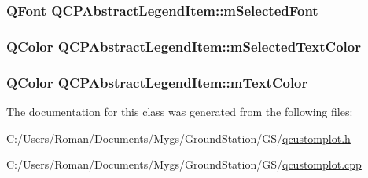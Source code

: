 \subsubsection[{m\+Selected\+Font}]{\setlength{\rightskip}{0pt plus 5cm}Q\+Font Q\+C\+P\+Abstract\+Legend\+Item\+::m\+Selected\+Font\hspace{0.3cm}{\ttfamily [protected]}}\label{class_q_c_p_abstract_legend_item_ab971df604306b192875a7d097feb1e21}
\hypertarget{class_q_c_p_abstract_legend_item_a4965c13854d970b24c284f0a4f005fbd}{}
\subsubsection[{m\+Selected\+Text\+Color}]{\setlength{\rightskip}{0pt plus 5cm}Q\+Color Q\+C\+P\+Abstract\+Legend\+Item\+::m\+Selected\+Text\+Color\hspace{0.3cm}{\ttfamily [protected]}}\label{class_q_c_p_abstract_legend_item_a4965c13854d970b24c284f0a4f005fbd}
\hypertarget{class_q_c_p_abstract_legend_item_a974b21e9930227d281344bd2242d289d}{}
\subsubsection[{m\+Text\+Color}]{\setlength{\rightskip}{0pt plus 5cm}Q\+Color Q\+C\+P\+Abstract\+Legend\+Item\+::m\+Text\+Color\hspace{0.3cm}{\ttfamily [protected]}}\label{class_q_c_p_abstract_legend_item_a974b21e9930227d281344bd2242d289d}


The documentation for this class was generated from the following files\+:\begin{DoxyCompactItemize}
\item 
C\+:/\+Users/\+Roman/\+Documents/\+Mygs/\+Ground\+Station/\+G\+S/\hyperlink{qcustomplot_8h}{qcustomplot.\+h}\item 
C\+:/\+Users/\+Roman/\+Documents/\+Mygs/\+Ground\+Station/\+G\+S/\hyperlink{qcustomplot_8cpp}{qcustomplot.\+cpp}\end{DoxyCompactItemize}

